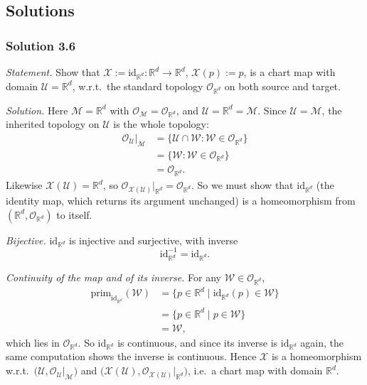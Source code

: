 \documentclass[11pt]{article}
\newcommand{\prim}[1]{\mathrm{prim}_{#1}}
\begin{document}
\subsection*{Solutions}

\subsubsection*{Solution 3.6}

\noindent\textit{Statement.} Show that $\mathcal X:=\mathrm{id}_{\mathbb R^d}:\mathbb R^d\to\mathbb R^d$, $\mathcal X(p):=p$, is a chart map with domain $\mathcal U=\mathbb R^d$, w.r.t.\ the standard topology $\mathcal O_{\mathbb R^d}$ on both source and target.

\medskip
\noindent\textit{Solution.} Here $\mathcal M=\mathbb R^d$ with $\mathcal O_{\mathcal M}=\mathcal O_{\mathbb R^d}$, and $\mathcal U=\mathbb R^d=\mathcal M$. Since $\mathcal U=\mathcal M$, the inherited topology on $\mathcal U$ is the whole topology:
\begin{align*}
\mathcal O_{\mathcal U}\big|_{\mathcal M}
&=\{\mathcal U\cap\mathcal W:\mathcal W\in\mathcal O_{\mathbb R^d}\}\\
&=\{\mathcal W:\mathcal W\in\mathcal O_{\mathbb R^d}\}\\
&=\mathcal O_{\mathbb R^d}.
\end{align*}
Likewise $\mathcal X(\mathcal U)=\mathbb R^d$, so $\mathcal O_{\mathcal X(\mathcal U)}|_{\mathbb R^d}=\mathcal O_{\mathbb R^d}$. So we must show that $\mathrm{id}_{\mathbb R^d}$ (the identity map, which returns its argument unchanged) is a homeomorphism from $(\mathbb R^d,\mathcal O_{\mathbb R^d})$ to itself.

\emph{Bijective.} $\mathrm{id}_{\mathbb R^d}$ is injective and surjective, with inverse
\[
\mathrm{id}_{\mathbb R^d}^{-1}=\mathrm{id}_{\mathbb R^d}.
\]

\emph{Continuity of the map and of its inverse.} For any $\mathcal W\in\mathcal O_{\mathbb R^d}$,
\begin{align*}
\prim{\mathrm{id}_{\mathbb R^d}}(\mathcal W)
&=\{p\in\mathbb R^d\mid\mathrm{id}_{\mathbb R^d}(p)\in\mathcal W\}\\
&=\{p\in\mathbb R^d\mid p\in\mathcal W\}\\
&=\mathcal W,
\end{align*}
which lies in $\mathcal O_{\mathbb R^d}$. So $\mathrm{id}_{\mathbb R^d}$ is continuous, and since its inverse is $\mathrm{id}_{\mathbb R^d}$ again, the same computation shows the inverse is continuous. Hence $\mathcal X$ is a homeomorphism w.r.t.\ $\big(\mathcal U,\mathcal O_{\mathcal U}|_{\mathcal M}\big)$ and $\big(\mathcal X(\mathcal U),\mathcal O_{\mathcal X(\mathcal U)}|_{\mathbb R^d}\big)$, i.e.\ a chart map with domain $\mathbb R^d$.
\end{document}
